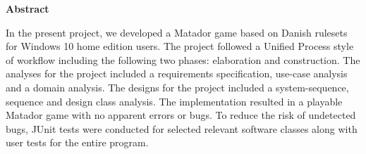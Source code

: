 \begin{flushleft} %

\begin{center}
    \vspace{0.9cm}
    \textbf{Abstract}
\end{center}
\doublespacing

In the present project, we developed a Matador game based on Danish rulesets for Windows 10 home edition users. The project followed a Unified Process style of workflow including the following two phases: elaboration and construction. The analyses for the project included a requirements specification, use-case analysis and a domain analysis. The designs for the project included a system-sequence, sequence and design class analysis. The implementation resulted in a playable Matador game with no apparent errors or bugs. To reduce the risk of undetected bugs, JUnit tests were conducted for selected relevant software classes along with user tests for the entire program.



\end{flushleft}